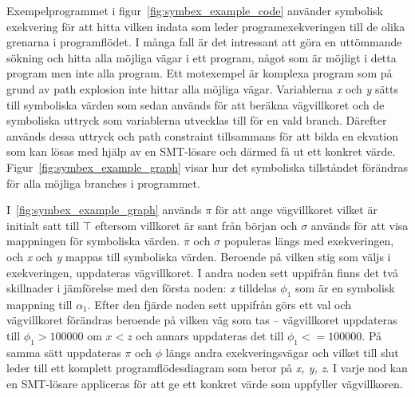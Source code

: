 Exempelprogrammet i figur~\ref{fig:symbex_example_code} använder symbolisk
exekvering för att hitta vilken indata som leder programexekveringen till de
olika grenarna i programflödet. I många fall är det intressant att göra en
uttömmande sökning och hitta alla möjliga vägar i ett program, något som är
möjligt i detta program men inte alla program. Ett motexempel är komplexa
program som på grund av path explosion inte hittar alla möjliga vägar.
Variablerna \emph{x} och \emph{y} sätts till symboliska värden som sedan används
för att beräkna vägvillkoret och de symboliska uttryck som variablerna utvecklas
till för en vald branch. Därefter används dessa uttryck och path constraint
tillsammans för att bilda en ekvation som kan lösas med hjälp av en SMT-lösare
och därmed få ut ett konkret värde. Figur~\ref{fig:symbex_example_graph} visar
hur det symboliska tillståndet förändras för alla möjliga branches i programmet.

I~\ref{fig:symbex_example_graph} används $\pi$ för att ange vägvillkoret vilket
är initialt satt till $\top$ eftersom villkoret är sant från början och $\sigma$
används för att visa mappningen för symboliska värden. $\pi$ och $\sigma$
populeras längs med exekveringen, och \emph{x} och \emph{y} mappas till
symboliska värden. Beroende på vilken stig som väljs i exekveringen, uppdateras
vägvillkoret. I andra noden sett uppifrån finns det två skillnader i jämförelse
med den första noden: \emph{x} tilldelas $\phi_1$ som är en symbolisk mappning
till $\alpha_1$. Efter den fjärde noden sett uppifrån görs ett val och
vägvillkoret förändras beroende på vilken väg som tas -- vägvillkoret uppdateras
till $\phi_1 > 100000$ om $x < z$ och annars uppdateras det till $\phi_1 <=
    100000$. På samma sätt uppdateras $\pi$ och $\phi$ längs andra exekveringsvägar
och vilket till slut leder till ett komplett programflödesdiagram som beror på
\emph{x, y, z}. I varje nod kan en SMT-lösare appliceras för att ge ett konkret
värde som uppfyller vägvillkoren.
